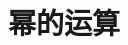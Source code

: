 \section{幂的运算}

\begin{comment}
\item {
    当 $ x=7, y=-\frac{1}{7}$ 时, 求 $x^{4n+1}\cdot y^{4n+2}$ ($n$为整数)的值.
    \ifshowSolution
        \fangsong\zihao{4}
        \\
        思路: 观察到$xy=-1$,让将$x$和$y$凑成一对,相乘.直接将$x, y$的值代入表达式中进行计算.

        解答: 
        \begin{align*}
            \mbox{原式} &= 7^{4n+1}\cdot \left(-\frac{1}{7}\right) ^{4n+2}\\
            &= [7\times(-\frac{1}{7})]^{4n+1} \cdot(-\frac{1}{7})\\
            &= (-1)^{4n+1} \cdot(-\frac{1}{7})\\
            &= \frac{1}{7}.
        \end{align*}
    \else
        \\ \\ \\
    \fi
}
\end{comment}

\begin{comment}
\item {
    已知$ m=8^9, n=9^8 $, 用含$m, n$的式子表示 $72^{72}$.
    \ifshowSolution
        \fangsong\zihao{4}
        \\
        思路: 观察到$72=8\times 9$,将原式中的72分解,凑出$m, n$.
        
        解答: 
        \begin{align*}
            \mbox{原式} &= (8\times 9)^{72}\\
            &= 8^{72}\times 9^{72}\\
            &= (8^9)^8\times (9^8)^9\\
            &= m^8 n^9.
        \end{align*}
    \else
        \\ \\ \\
    \fi
}
\end{comment}

\begin{comment}
\item {
    已知$x-y=k$, 求$(3x-3y)^3.$
    \ifshowSolution
        \fangsong\zihao{4}
        \\
        解答: 
        \begin{align*}
            \mbox{原式} &= [3(x-y)]^3\\
            &= 27(x-y)^3\\
            &= 27k^3.
        \end{align*}
    \else
        \\ \\ \\
    \fi
}
\end{comment}

